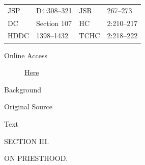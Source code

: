 				\begin{tabular}{p{0.5in}p{1in}p{0.5in}p{1in}}
				JSP	 	& D4:308--321		& JSR 		& 267--273 \\
				DC	 	& Section 107 		& HC 		& 2:210--217 \\
				HDDC 	& 1398--1432		& TCHC 		& 2:218--222 \\
				\end{tabular}
			
			\begin{description}
				\item[Online Access] \href{https://www.josephsmithpapers.org/paper-summary/instruction-on-priesthood-between-circa-1-march-and-circa-4-may-1835-dc-107/1}{Here}
			\end{description}
			
			\begin{description}
				\item[Background]
			\end{description}
			
			
			\begin{description}
				\item[Original Source]
			\end{description}
			
			
			\begin{description}
				\item[Text]
			\end{description}
			
				\begin{tightcenter}
					SECTION III.

					ON PRIESTHOOD.
				\end{tightcenter}

